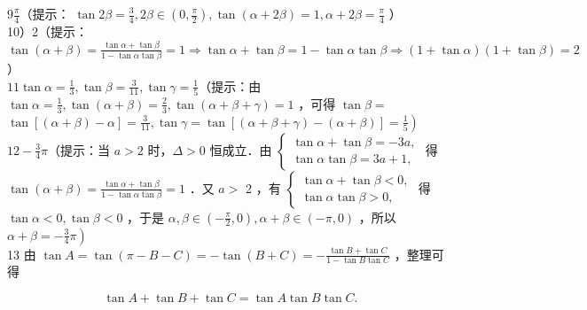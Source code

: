 \documentclass[10pt]{article}
\begin{document}
\(9 \frac{\pi}{4}\)（提示： \(\tan 2 \beta=\frac{3}{4}, 2 \beta \in\left(0, \frac{\pi}{2}\right), \tan (\alpha+2 \beta)=1, \alpha+2 \beta=\frac{\pi}{4}\) ）\\
10）2（提示： \(\tan (\alpha+\beta)=\frac{\tan \alpha+\tan \beta}{1-\tan \alpha \tan \beta}=1 \Rightarrow \tan \alpha+\tan \beta=1-\tan \alpha \tan \beta \Rightarrow(1+\tan \alpha)(1+\tan \beta)=2\) ）\\
\(11 \tan \alpha=\frac{1}{3}, \tan \beta=\frac{3}{11}, \tan \gamma=\frac{1}{5}\)（提示：由 \(\tan \alpha=\frac{1}{3}, \tan (\alpha+\beta)=\frac{2}{3}, \tan (\alpha+\beta+\gamma)=1\) ，可得 \(\tan \beta=\) \(\left.\tan [(\alpha+\beta)-\alpha]=\frac{3}{11}, \tan \gamma=\tan [(\alpha+\beta+\gamma)-(\alpha+\beta)]=\frac{1}{5}\right)\)\\
\(12-\frac{3}{4} \pi\)（提示：当 \(a>2\) 时，\(\Delta>0\) 恒成立．由 \(\left\{\begin{array}{l}\tan \alpha+\tan \beta=-3 a, \\ \tan \alpha \tan \beta=3 a+1,\end{array}\right.\) 得 \(\tan (\alpha+\beta)=\frac{\tan \alpha+\tan \beta}{1-\tan \alpha \tan \beta}=1\) ．又 \(a>\) 2 ，有 \(\left\{\begin{array}{l}\tan \alpha+\tan \beta<0, \\ \tan \alpha \tan \beta>0,\end{array}\right.\) 得 \(\tan \alpha<0, \tan \beta<0\) ，于是 \(\alpha, \beta \in\left(-\frac{\pi}{2}, 0\right), \alpha+\beta \in(-\pi, 0)\) ，所以 \(\left.\alpha+\beta=-\frac{3}{4} \pi\right)\)\\
13 由 \(\tan A=\tan (\pi-B-C)=-\tan (B+C)=-\frac{\tan B+\tan C}{1-\tan B \tan C}\) ，整理可得

\[
\tan A+\tan B+\tan C=\tan A \tan B \tan C .
\]
\end{document}

